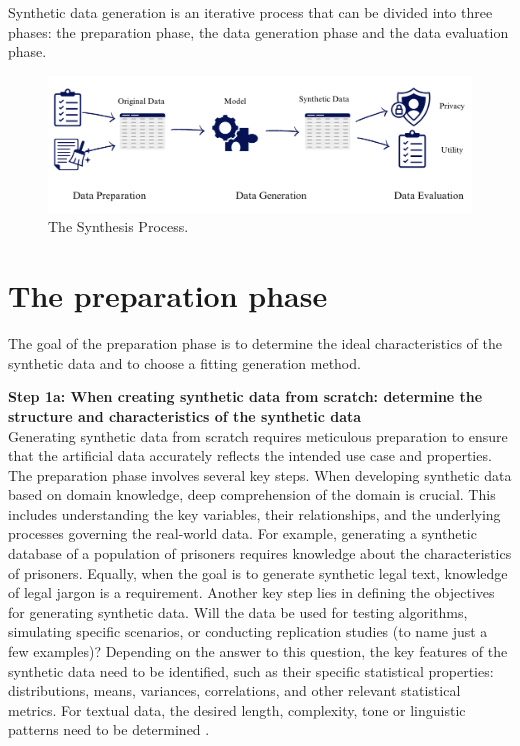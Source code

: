 

Synthetic data generation is an iterative process that can be divided into three phases: the preparation phase, the data generation phase and the data evaluation phase. 

\vspace{10pt}
\begin{figure}[h!]
    \centering
    \includegraphics[width=\textwidth]{Images/Screenshot 2024-08-06 at 12.00.18.png}
    \caption{The Synthesis Process.}
    \label{fig:synthesis_1}
\end{figure}
\vspace{10pt}

\section{The preparation phase}

The goal of the preparation phase is to determine the ideal characteristics of the synthetic data and to choose a fitting generation method.

\textbf{Step 1a: When creating synthetic data from scratch: determine the structure and characteristics of the synthetic data} \\
Generating synthetic data from scratch requires meticulous preparation to ensure that the artificial data accurately reflects the intended use case and properties. The preparation phase involves several key steps. When developing synthetic data based on domain knowledge, deep comprehension of the domain is crucial. This includes understanding the key variables, their relationships, and the underlying processes governing the real-world data. For example, generating a synthetic database of a population of prisoners requires knowledge about the characteristics of prisoners. Equally, when the goal is to generate synthetic legal text, knowledge of legal jargon is a requirement. Another key step lies in defining the objectives for generating synthetic data. Will the data be used for testing algorithms, simulating specific scenarios, or conducting replication studies (to name just a few examples)? Depending on the answer to this question, the key features of the synthetic data need to be identified, such as their specific statistical properties: distributions, means, variances, correlations, and other relevant statistical metrics. For textual data, the desired length, complexity, tone or linguistic patterns need to be determined \cite{el2020practical,soltana2017synthetic}.

